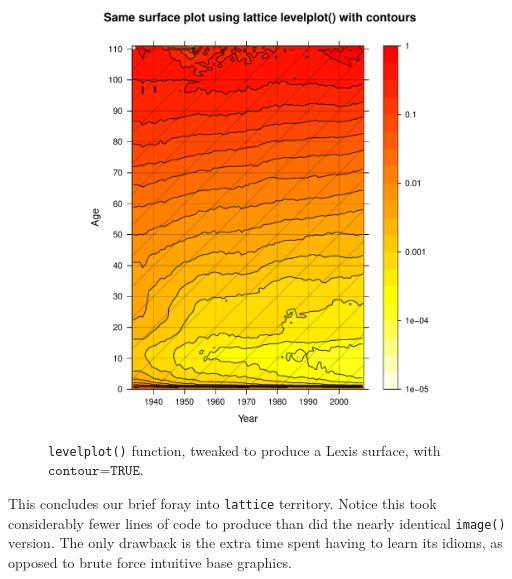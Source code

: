 \begin{figure}[H]
\centering
\includegraphics[width=4.5in,height=4.5in]{figs/latticegoodcontour.pdf}
\caption{\texttt{levelplot()} function, tweaked to produce a Lexis surface, with $\texttt{contour=TRUE}$.}
\end{figure}


This concludes our brief foray into \texttt{lattice} territory. Notice this took considerably fewer lines of code to produce than did the nearly identical \texttt{image()} version. The only drawback is the extra time spent having to learn its idioms, as opposed to brute force intuitive base graphics.
